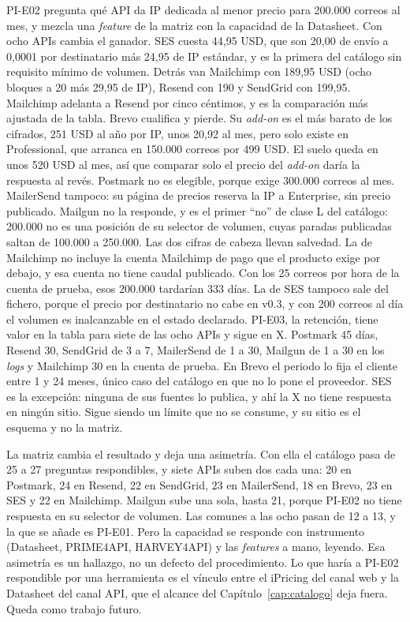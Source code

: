 PI-E02 pregunta qué API da IP dedicada al menor precio para 200.000 correos al mes, y
mezcla una \textit{feature} de la matriz con la capacidad de la Datasheet. Con ocho APIs
cambia el ganador. SES cuesta 44,95 USD, que son 20,00 de envío a 0,0001 por destinatario
más 24,95 de IP estándar, y es la primera del catálogo sin requisito mínimo de volumen.
Detrás van Mailchimp con 189,95 USD (ocho bloques a 20 más 29,95 de IP), Resend con 190
y SendGrid con 199,95. Mailchimp adelanta a Resend por cinco céntimos, y es la
comparación más ajustada de la tabla.
Brevo cualifica y pierde. Su \textit{add-on} es el más barato de los cifrados, 251 USD al
año por IP, unos 20,92 al mes, pero solo existe en Professional, que arranca en 150.000
correos por 499 USD. El suelo queda en unos 520 USD al mes, así que comparar solo el
precio del \textit{add-on} daría la respuesta al revés.
Postmark no es elegible, porque exige 300.000 correos al mes.
MailerSend tampoco: su página de precios reserva la IP a Enterprise, sin precio publicado.
Mailgun no la responde, y es el primer ``no'' de clase L del catálogo: 200.000 no es una
posición de su selector de volumen, cuyas paradas publicadas saltan de 100.000 a 250.000.
Las dos cifras de cabeza llevan salvedad. La de Mailchimp no incluye la cuenta Mailchimp
de pago que el producto exige por debajo, y esa cuenta no tiene caudal publicado. Con los
25 correos por hora de la cuenta de prueba, esos 200.000 tardarían 333
días. La de SES tampoco sale del fichero, porque el precio por destinatario no cabe en
v0.3, y con 200 correos al día el volumen es inalcanzable en el estado declarado.
PI-E03, la retención, tiene valor en la tabla para siete de las ocho APIs y sigue en X.
Postmark 45 días, Resend 30, SendGrid de 3 a 7, MailerSend de 1 a 30, Mailgun de 1 a 30
en los \textit{logs} y Mailchimp 30 en la cuenta de prueba. En Brevo el periodo lo fija
el cliente entre 1 y 24 meses, único caso del catálogo en que no lo pone el proveedor.
SES es la excepción: ninguna de sus fuentes lo publica, y ahí la X no tiene respuesta en
ningún sitio. Sigue siendo un límite que no se consume, y su sitio es el esquema y no la
matriz.

La matriz cambia el resultado y deja una asimetría. Con ella el catálogo pasa de 25 a 27
preguntas respondibles, y siete APIs suben dos cada una: 20 en Postmark, 24 en Resend, 22
en SendGrid, 23 en MailerSend, 18 en Brevo, 23 en SES y 22 en Mailchimp. Mailgun sube una
sola, hasta 21, porque PI-E02 no tiene respuesta en su selector de volumen. Las comunes a
las ocho pasan de 12 a 13, y la que se añade es PI-E01. Pero la capacidad se responde con
instrumento (Datasheet, PRIME4API, HARVEY4API) y las \textit{features} a
mano, leyendo. Esa asimetría es un hallazgo, no un defecto del procedimiento. Lo que
haría a PI-E02 respondible por una herramienta es el vínculo entre el iPricing del
canal web y la Datasheet del canal API, que el alcance del
Capítulo~\ref{cap:catalogo} deja fuera. Queda como trabajo futuro.

